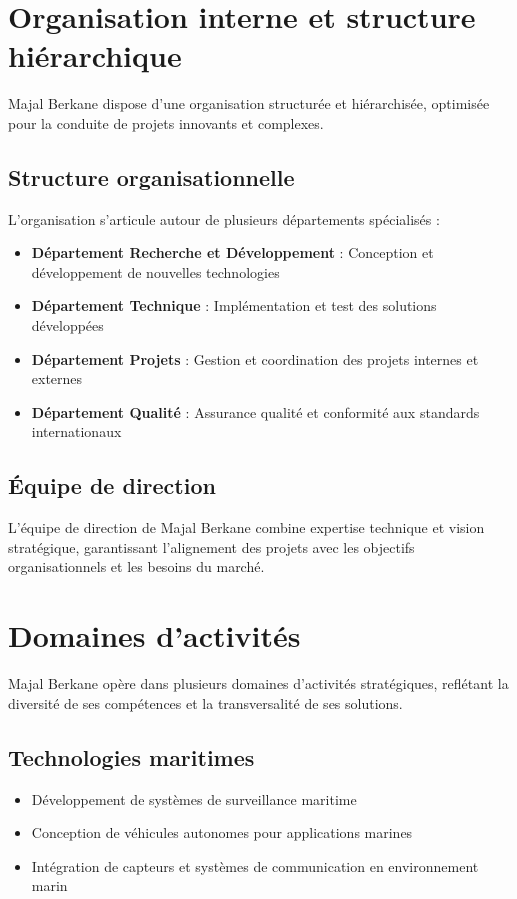 {\section{Organisation interne et structure hiérarchique}
Majal Berkane dispose d'une organisation structurée et hiérarchisée, optimisée pour la conduite de projets innovants et complexes.

\subsection{Structure organisationnelle}
L'organisation s'articule autour de plusieurs départements spécialisés :
\begin{itemize}
    \item \textbf{Département Recherche et Développement} : Conception et développement de nouvelles technologies
    \item \textbf{Département Technique} : Implémentation et test des solutions développées
    \item \textbf{Département Projets} : Gestion et coordination des projets internes et externes
    \item \textbf{Département Qualité} : Assurance qualité et conformité aux standards internationaux
\end{itemize}

\subsection{Équipe de direction}
L'équipe de direction de Majal Berkane combine expertise technique et vision stratégique, garantissant l'alignement des projets avec les objectifs organisationnels et les besoins du marché.

\section{Domaines d'activités}
Majal Berkane opère dans plusieurs domaines d'activités stratégiques, reflétant la diversité de ses compétences et la transversalité de ses solutions.

\subsection{Technologies maritimes}
\begin{itemize}
    \item Développement de systèmes de surveillance maritime
    \item Conception de véhicules autonomes pour applications marines
    \item Intégration de capteurs et systèmes de communication en environnement marin
\end{itemize}

}
